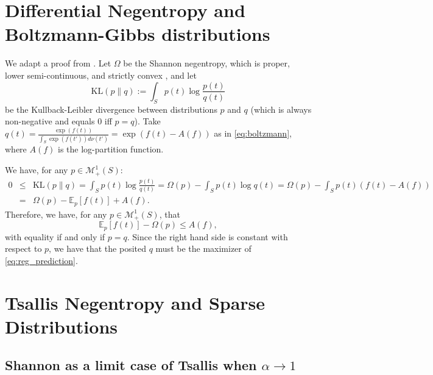 \documentclass{article}
\begin{document}
\section{Differential Negentropy and Boltzmann-Gibbs distributions}\label{sec:diff_ent_exp_family}

We adapt a proof from \citet{cover2012elements}.
Let $\Omega$ be the Shannon negentropy, which is proper, lower semi-continuous, and strictly convex \citep[example~9.41]{Bauschke_Combettes2011}, and let  $$\mathrm{KL}(p \| q) := \int_S p(t) \log \frac{p(t)}{q(t)}$$ be the Kullback-Leibler divergence between distributions $p$ and $q$ (which is always non-negative and equals $0$ iff $p=q$).
Take $q(t) = \frac{\exp(f(t))}{\int_S \exp(f(t'))d\nu(t')} = \exp(f(t) - A(f))$ as in \eqref{eq:boltzmann}, where $A(f)$ is the log-partition function.

We have, for any $p \in \mathcal{M}_+^1(S)$:
\begin{eqnarray}
0 &\le& \mathrm{KL}(p \| q) 
= \int_S p(t) \log \frac{p(t)}{q(t)} 
= \Omega(p) - \int_S p(t) \log q(t) 
= \Omega(p) - \int_S p(t) (f(t) - A(f)) \nonumber\\
&=& \Omega(p) - \mathbb{E}_p[f(t)]  + A(f).
\end{eqnarray}
Therefore, we have, for any  $p \in \mathcal{M}_+^1(S)$, that
\begin{equation}
\mathbb{E}_p[f(t)]  - \Omega(p) \le A(f),
\end{equation}
with equality if and only if $p=q$. Since the right hand side is constant with respect to $p$, we have that the posited $q$ must be the maximizer of \eqref{eq:reg_prediction}.





\section{Tsallis Negentropy and  Sparse Distributions}\label{sec:gini_ent_sparse_family}



\subsection{Shannon as a limit case of Tsallis when $\alpha\rightarrow 1$}
\end{document}
